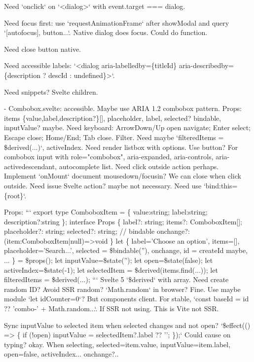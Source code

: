 \begin{decodedreasoningpanel}
Need `onclick` on `<dialog>` with event.target === dialog.

Need focus first: use `requestAnimationFrame` after showModal and query `[autofocus], button...`. Native dialog does focus. Could do function.

Need close button native.

Need accessible labels: `<dialog aria-labelledby=\{titleId\} aria-describedby=\{description ? descId : undefined\}>`.

Need snippets? Svelte children.

- Combobox.svelte: accessible. Maybe use ARIA 1.2 combobox pattern. Props: items \{value,label,description?\}[], placeholder, label, selected? bindable, inputValue? maybe. Need keyboard: ArrowDown/Up open navigate; Enter select; Escape close; Home/End; Tab close. Filter. Need maybe `filteredItems = \$derived(...)`, activeIndex. Need render listbox with options. Use button? For combobox input with role="combobox", aria-expanded, aria-controls, aria-activedescendant, autocomplete list. Need click outside action perhaps. Implement `onMount` document mousedown/focusin? We can close when click outside. Need issue Svelte action? maybe not necessary. Need use `bind:this=\{root\}`.

Props:
```
export type ComboboxItem = \{ value:string; label:string; description?:string \};
interface Props \{
 label?: string;
 items?: ComboboxItem[];
 placeholder?: string;
 selected?: string; // bindable
 onchange?: (item:ComboboxItem|null)=>void
\}
let \{ label='Choose an option', items=[], placeholder='Search...', selected = \$bindable(''), onchange, id = createId maybe, ... \} = \$props();
let inputValue=\$state('');
let open=\$state(false);
let activeIndex=\$state(-1);
let selectedItem = \$derived(items.find(...));
let filteredItems = \$derived(...);
```
Svelte 5 `\$derived` with array. Need create random ID? Avoid SSR random? `Math.random` in browser? Fine. Use maybe module `let idCounter=0`? But components client. For stable, `const baseId = id ?? 'combo-' + Math.random...`. If SSR not using. This is Vite not
SSR.

Sync inputValue to selected item when selected changes and not open? `\$effect(() => \{ if (!open) inputValue = selectedItem?.label ?? ''; \});` Could cause on typing? okay. When selecting, selected=item.value, inputValue=item.label, open=false, activeIndex... onchange?..


\end{decodedreasoningpanel}
